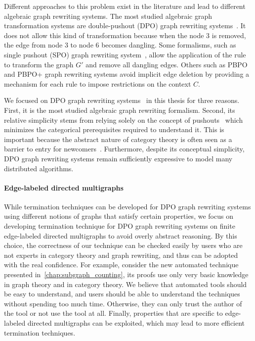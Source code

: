 Different approaches to this problem exist in the literature and lead to different algebraic graph rewriting systems.   
The most studied algebraic graph transformation systems are double-pushout (DPO) graph rewriting systems~\cite{corradini1997algebraic}. It does not allow this kind of transformation because when the node 3 is removed, the edge from node 3 to node 6 becomes dangling. Some formalisms, such as single pushout (SPO) graph rewriting system~\cite{ehrig1997algebraic}, allow the application of the rule to transform the graph $G'$ and remove all dangling edges. Others such as PBPO and PBPO+ graph rewriting systems avoid implicit edge deletion by providing a mechanism for each rule to impose restrictions on the context $C$. 

   We focused on DPO graph rewriting systems~\cite{corradini1997algebraic} in this thesis for three reasons. First, it is the most studied algebraic graph rewriting formalism. 
   Second, its relative simplicity stems from relying solely on the concept of pushouts~\cite{pierce1991basic} which minimizes the categorical prerequisites required to understand it. This is important because the abstract nature of category theory is often seen as a barrier to entry for newcomers~\cite{overbeekthesis}.
    Furthermore, despite its conceptual simplicity, DPO graph rewriting systems remain sufficiently expressive to model many distributed algorithms.



\paragraph{Edge-labeled directed multigraphs}
 While termination techniques can be developed for DPO graph rewriting systems using different notions of graphs that satisfy certain properties, we focus on developing termination technique for DPO graph rewriting systems on finite edge-labeled directed multigraphs to avoid overly abstract reasoning.
 By this choice, the correctness of our technique can be checked easily by users who are not experts in category theory and graph rewriting, and thus can be adopted with the real confidence. For example, consider the new automated technique presented in~\autoref{chap:subgraph_counting}, its proofs use only very basic knowledge in graph theory and in category theory. We believe that automated tools should be easy to understand, and users should be able to understand the techniques without spending too much time. Otherwise, they can only trust the author of the tool or not use the tool at all.
 Finally, properties that are specific to edge-labeled directed multigraphs can be exploited, which may lead to more efficient termination techniques.

